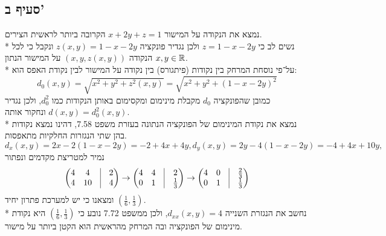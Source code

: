 \subsection{סעיף ב'}
נמצא את הנקודה על המישור $x + 2y + z = 1$ הקרובה ביותר לראשית הצירים. \\*
נשים לב כי $z = 1 - x - 2y$ ולכן נגדיר פונקציה $z(x, y) = 1 - x - 2y$ ונקבל כי לכל $x, y \in \mathbb{R}$ הנקודה $(x, y, z(x, y))$ על המישור הנתון. \\*
על־פי נוסחת המרחק בין נקודות (פיתגורס) בין נקודה על המישור לבין נקודת האפס הוא:
\[
	d_0(x, y)
	= \sqrt{x^2 + y^2 + z^2(x, y)}
	= \sqrt{x^2 + y^2 + {(1 - x - 2y)}^2}
\]
כמובן שהפונקציה $d_0$ מקבלת מינימום ומקסימום באותן הנקודות כמו $d_0^2$, ולכן נגדיר $d(x, y) = d_0^2(x, y)$ ונחקור אותה. \\*
נמצא את נקודת המינימום של הפונקציה הנתונה בעזרת משפט 7.58, דהינו נמצא נקודות בהן שתי הנגזרות החלקיות מתאפסות.
\[
	d_x(x, y) = 2x - 2(1 - x - 2y) = -2 + 4x + 4y,
	d_y(x, y) = 2y - 4(1 - x - 2y) = -4 + 4x + 10y,
\]
נמיר למטריצת מקדמים ונפתור
\[
	\begin{pmatrix}
		4 & 4 & \vline & 2 \\
		4 & 10 & \vline & 4
	\end{pmatrix}
	\rightarrow
	\begin{pmatrix}
		4 & 4 & \vline & 2 \\
		0 & 1 & \vline & \frac{1}{3}
	\end{pmatrix}
	\rightarrow
	\begin{pmatrix}
		4 & 0 & \vline & \frac{2}{3} \\
		0 & 1 & \vline & \frac{1}{3}
	\end{pmatrix}
\]
ומצאנו כי יש למערכת פתרון יחיד $(\frac{1}{6}, \frac{1}{3})$. \\*
נחשב את הנגזרת השנייה $d_{xx}(x, y) = 4$, ולכן ממשפט 7.72 נובע כי
$(\frac{1}{6}, \frac{1}{3})$ היא נקודת מינימום של הפונקציה ובה המרחק מהראשית הוא הקטן ביותר על מישור.


